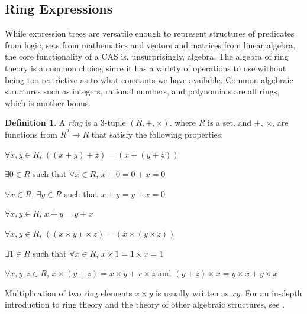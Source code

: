\documentclass{article}
\theoremstyle{definition}
\newtheorem{defin}[thm]{Definition}
\begin{document}
\subsection{Ring Expressions}

While expression trees are versatile enough to represent structures of predicates from logic, sets from mathematics and vectors and matrices from linear algebra, the core functionality of a CAS is, unsurprisingly, algebra. The algebra of ring theory is a common choice, since it has a variety of operations to use without being too restrictive as to what constants we have available. Common algebraic structures such as integers, rational numbers, and polynomials are all rings, which is another bonus.

\begin{defin}
    A \emph{ring} is a 3-tuple $(R, +, \times)$, where $R$ is a set, and $+$, $\times$, are functions from $R^2 \to R$ that satisfy the following properties:
    
    \begin{description}[style=multiline,
            topsep=5pt,
            leftmargin=5.5cm]
        \item[\emph{Additive associativity:}] $\forall x, y \in R$, $((x + y) + z) = (x + (y + z))$
        \item[\emph{Additive identity:}] $\exists 0 \in R$ such that $\forall x \in R$, $x+0=0+x=0$
        \item[\emph{Additive inverse:}] $\forall x \in R$, $\exists y \in R$ such that $x + y = y + x = 0$
        \item[\emph{Additive commutativity:}] $\forall x, y \in R$, $x + y = y + x$
        \item[\emph{Multiplicative associativity:}] $\forall x, y \in R$, $((x \times y) \times z) = (x \times (y \times z))$
        \item[\emph{Multiplicative identity:}] $\exists 1 \in R$ such that $\forall x \in R$, $x\times 1 = 1 \times x=1$
        
        \item[\emph{Distributive Property:}] $\forall x,y,z \in R$, $x \times (y + z) = x\times y + x\times z$ and $(y + z) \times x = y\times x + y\times x$
    \end{description}
\end{defin}

Multiplication of two ring elements $x \times y$ is usually written as $xy$. For an in-depth introduction to ring theory and the theory of other algebraic structures, see \cite{aa}.
\end{document}
